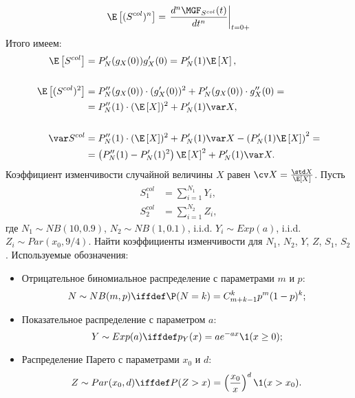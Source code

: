         \begin{equation*}
            \E\left[(S^{col})^n\right] = \left.\frac{d^n \MGF_{S^{col}} (t)}{dt^n}\right|_{t=0+}
        \end{equation*}
        Итого имеем:
        \begin{align*}
            \E\left[S^{col}\right]     &= P_N'(g_X(0)) g_X'(0) =  P_N'(1) \E\left[X\right], \\ \\
            \E\left[(S^{col})^2\right] &= P_N''(g_X(0))\cdot (g_X'(0))^2 + P_N'(g_X(0))\cdot g_X''(0) =\\
                                       &= P_N''(1)\cdot (\E\left[X\right])^2 + P_N'(1)\var X, \\ \\
            \var S^{col}               &= P_N''(1)\cdot (\E\left[X\right])^2 + P_N'(1)\var X - \left(P_N'(1) \E\left[X\right]\right)^2 = \\ 
                                       &= \left(P_N''(1) - P_N'(1)^2\right)\E\left[X\right]^2 + P_N'(1)\var X.
        \end{align*}
    \problem{}
        Коэффициент изменчивости случайной величины $X$ равен $\cv X = \frac{\std X}{\E\left[X\right]}$. Пусть
        \begin{align*}
            S_1^{col} &= \sum_{i=1}^{N_1} Y_i, \\
            S_2^{col} &= \sum_{i=1}^{N_2} Z_i,
        \end{align*}
        где $N_1 \sim NB(10, 0.9)$, $N_2 \sim NB(1, 0.1)$, i.i.d. $Y_i \sim Exp (a)$, i.i.d. $Z_i \sim Par(x_0, 9/4)$. Найти коэффициенты изменчивости для $N_1$, $N_2$, $Y$, $Z$, $S_1$, $S_2$.
        Используемые обозначения:
        \begin{itemize}
            \item Отрицательное биномиальное распределение с параметрами $m$ и $p$:
                \begin{equation*}
                    N \sim NB(m, p) \iffdef \P(N = k) = C_{m+k-1}^{k}p^m(1-p)^k;
                \end{equation*}
            \item Показательное распределение с параметром $a$:
                \begin{equation*}
                    Y \sim Exp(a) \iffdef p_Y(x) = ae^{-ax}\1(x \geq 0);
                \end{equation*}
            \item Распределение Парето с параметрами $x_0$ и $d$:
                \begin{equation*}
                        Z \sim Par(x_0, d) \iffdef P(Z > x) = \left(\frac{x_0}{x}\right)^d\1(x > x_0).
                \end{equation*}
        \end{itemize}
